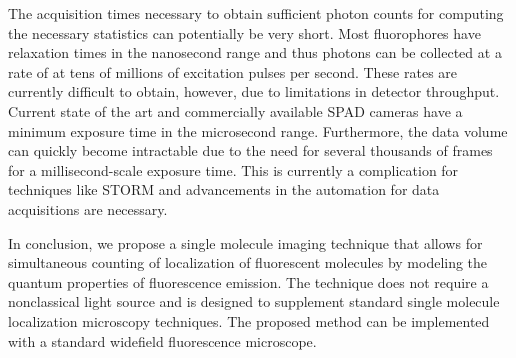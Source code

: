 \documentclass[a4paper, twocolumn, superscriptaddress,prl]{revtex4}  %
\begin{document}
The acquisition times necessary to obtain sufficient photon counts for computing the necessary statistics can potentially be very short. Most fluorophores have relaxation times in the nanosecond range and thus photons can be collected at a rate of at tens of millions of excitation pulses per second. These rates are currently difficult to obtain, however, due to limitations in detector throughput. Current state of the art and commercially available SPAD cameras have a minimum exposure time in the microsecond range. Furthermore, the data volume can quickly become intractable due to the need for several thousands of frames for a millisecond-scale exposure time. This is currently a complication for techniques like STORM and advancements in the automation for data acquisitions are necessary. 

In conclusion, we propose a single molecule imaging technique that allows for simultaneous counting of localization of fluorescent molecules by modeling the quantum properties of fluorescence emission. The technique does not require a nonclassical light source and is designed to supplement standard single molecule localization microscopy techniques. The proposed method can be implemented with a standard widefield fluorescence microscope.
\end{document}
